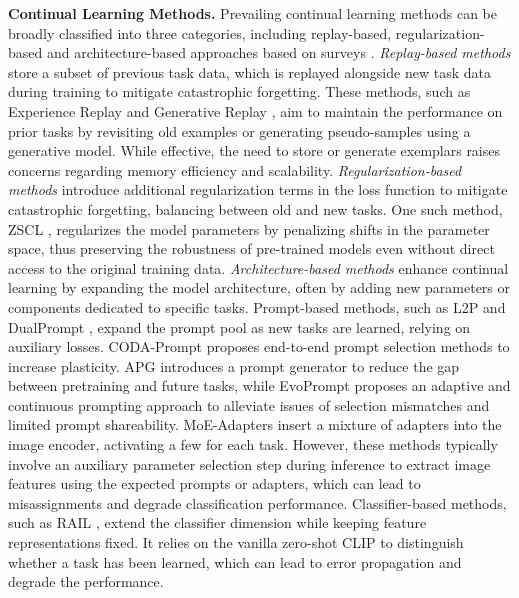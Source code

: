 \documentclass{article}
\theoremstyle{plain}
\theoremstyle{definition}
\theoremstyle{remark}
\begin{document}
\textbf{Continual Learning Methods.} Prevailing continual learning methods can be broadly classified into three categories, including replay-based, regularization-based and architecture-based approaches based on surveys \cite{de2021continual, wang2024comprehensive, roth2024practitioner}. 
%
\emph{Replay-based methods} \cite{rebuffi2017icarl, isele2018selective, lavda2018continual, lopez2017gradient,shin2017continual,rolnick2019experience} store a subset of previous task data, which is replayed alongside new task data during training to mitigate catastrophic forgetting. These methods, such as Experience Replay \cite{isele2018selective,rolnick2019experience} and Generative Replay \cite{lavda2018continual,shin2017continual}, aim to maintain the performance on prior tasks by revisiting old examples or generating pseudo-samples using a generative model. While effective, the need to store or generate exemplars raises concerns regarding memory efficiency and scalability.
%
\emph{Regularization-based methods}  \cite{zheng2023preventing,ahn2019uncertainty,kirkpatrick2017overcoming,jha2024npcl,zenke2017continual} introduce additional regularization terms in the loss function to mitigate catastrophic forgetting, balancing between old and new tasks. One such method, ZSCL \cite{zheng2023preventing}, regularizes the model parameters by penalizing shifts in the parameter space, thus preserving the robustness of pre-trained models even without direct access to the original training data.
%
\emph{Architecture-based methods} \cite{wang2024hierarchical,lu2024adaptive,li2019learn,houlsby2019parameter,yoon2018lifelong} enhance continual learning by expanding the model architecture, often by adding new parameters or components dedicated to specific tasks. 
Prompt-based methods, such as L2P \cite{wang2022learning} and DualPrompt \cite{wang2022dualprompt}, expand the prompt pool as new tasks are learned, relying on auxiliary losses. CODA-Prompt \cite{smith2023coda} proposes end-to-end prompt selection methods to increase plasticity. APG \cite{tang2023prompt} introduces a prompt generator to reduce the gap between pretraining and future tasks, while EvoPrompt \cite{kurniawan2024evolving} proposes an adaptive and continuous prompting approach to alleviate issues of selection mismatches and limited prompt shareability. MoE-Adapters \cite{yu2024boosting} insert a mixture of adapters into the image encoder, activating a few for each task. However, these methods typically involve an auxiliary parameter selection step during inference to extract image features using the expected prompts or adapters, which can lead to misassignments and degrade classification performance.
Classifier-based methods, such as RAIL \cite{xu2024advancing}, extend the classifier dimension while keeping feature representations fixed. It relies on the vanilla zero-shot CLIP to distinguish whether a task has been learned, which can lead to error propagation and degrade the performance.
\end{document}
